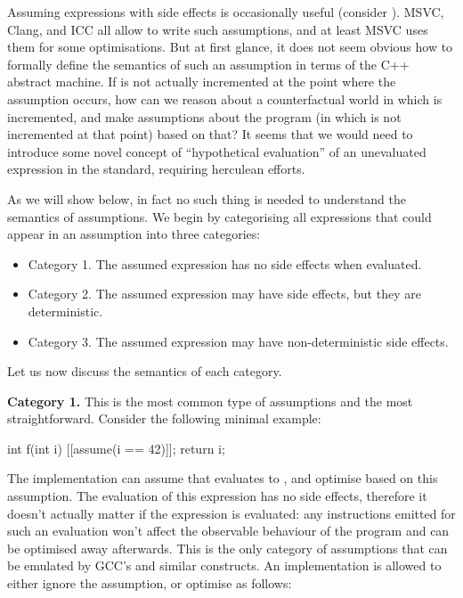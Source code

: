 Assuming expressions with side effects is occasionally useful (consider \tcode{[[assume(++ptr != end)]]}). MSVC, Clang, and ICC all allow to write such assumptions, and at least MSVC uses them for some optimisations. But at first glance, it does not seem obvious how to formally define the semantics of such an assumption in terms of the C++ abstract machine. If  is not actually incremented at the point where the assumption occurs, how can we reason about a counterfactual world in which  is incremented, and make assumptions about the program (in which  is not incremented at that point) based on that? It seems that we would need to introduce some novel concept of ``hypothetical evaluation'' of an unevaluated expression in the standard, requiring herculean efforts.

As we will show below, in fact no such thing is needed to understand the semantics of assumptions. We begin by categorising all expressions that could appear in an assumption into three categories:
\begin{itemize}
\item Category 1. The assumed expression has no side effects when evaluated.
\item Category 2. The assumed expression may have side effects, but they are deterministic.
\item Category 3. The assumed expression may have non-deterministic side effects.
\end{itemize}
Let us now discuss the semantics of each category.

\textbf{Category 1.} This is the most common type of assumptions and the most straightforward. Consider the following minimal example:

\begin{codeblock}
int f(int i) {
  [[assume(i == 42)]];
  return i;
}
\end{codeblock}

The implementation can assume that  evaluates to , and optimise based on this assumption. The evaluation of this expression has no side effects, therefore it doesn't actually matter if the expression is evaluated: any instructions emitted for such an evaluation won't affect the observable behaviour of the program and can be optimised away afterwards. This is the only category of assumptions that can be emulated by GCC's  and similar constructs. An implementation is allowed to either ignore the assumption, or optimise  as follows:

